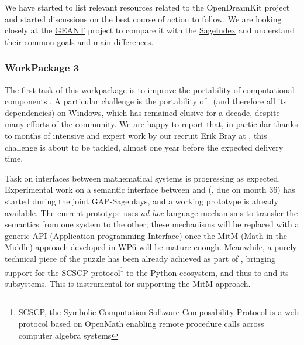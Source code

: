 \documentclass{deliverablereport}
\begin{document}
We have started to list relevant resources related to the OpenDreamKit project and started discussions
on the best course of action to follow. We are looking closely at the \href{https://oer.geant.org/}{GEANT} 
project to compare it with the \href{http://sageindex.lipn.univ-paris13.fr/}{SageIndex} and understand their
common goals and main differences.

  \subsubsection{WorkPackage 3}
  The first task of this workpackage is to improve the portability of computational
  components . A particular challenge is
  the portability of \Sage\ (and therefore all its dependencies) on Windows, which has
  remained elusive for a decade, despite many efforts of the community. We are happy to
  report that, in particular thanks to months of intensive and expert work by our recruit
  Erik Bray at , this challenge is about to be tackled, almost one year before
  the expected delivery time.

  Task  on interfaces between
  mathematical systems is progressing as expected. Experimental work on a semantic
  interface between \GAP and \Sage
  (, due on month 36) has
  started during the joint GAP-Sage days, and a working prototype is already
  available. The current prototype uses \emph{ad hoc} language mechanisms to transfer the
  semantics from one system to the other; these mechanisms will be replaced with a generic
  API (Application programming Interface) once the MitM (Math-in-the-Middle) approach
  developed in WP6 will be mature enough. Meanwhile, a purely technical piece of the
  puzzle has been already achieved as part of
  , bringing support for the SCSCP
  protocol\footnote{SCSCP, the
    \href{http://www.symbolic-computing.org/science/index.php/SCSCP}{Symbolic Computation
      Software Composability Protocol} is a web protocol based on OpenMath enabling remote
    procedure calls across computer algebra systems} to the Python ecosystem, and thus to
  \Sage and its subsystems. This is instrumental for supporting the MitM approach.
\end{document}
